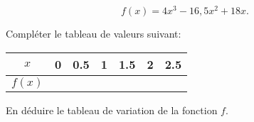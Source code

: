 \begin{equation*}
	f(x) = 4x^3 - 16,5 x^2 + 18 x.
\end{equation*}


\begin{questions}
	\question[2] Compléter le tableau de valeurs suivant:
	
	\begin{center}
		\begin{tabular}{|@{\ \ \ \ }c@{\ \ \ \ }|@{\ \ \ \ }c@{\ \ \ \ }|@{\ \ \ \ }c@{\ \ \ \ }|@{\ \ \ \ }c@{\ \ \ \ }|@{\ \ \ \ }c@{\ \ \ \ }|@{\ \ \ \ }c@{\ \ \ \ }|@{\ \ \ \ }c@{\ \ \ \ }|}
		\hline
		$x$ & 0 & \num{0.5} & \num{1}  & \num{1.5} & \num{2} & \num{2.5} \\ \hline
		$f(x)$ & & & & & & \\ \hline
	\end{tabular}
	\end{center}

	\question[4\half]
	
	\question[1\half] En déduire le tableau de variation de la fonction $f$.
\end{questions}